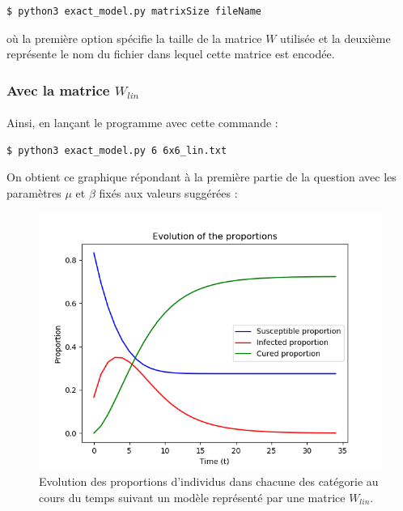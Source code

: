 \documentclass[a4paper, 12pt, oneside]{article}
\begin{document}
\begin{lstlisting}[language=bash]
$ python3 exact_model.py matrixSize fileName
\end{lstlisting}

\noindent où la première option spécifie la taille de la matrice $W$ utilisée et la deuxième représente le nom du fichier dans lequel cette matrice est encodée.

\subsubsection{Avec la matrice $W_{lin}$}

\paragraph{}Ainsi, en lançant le programme avec cette commande :

\begin{lstlisting}[language=bash]
$ python3 exact_model.py 6 6x6_lin.txt
\end{lstlisting}

\noindent On obtient ce graphique répondant à la première partie de la question avec les paramètres $\mu$ et $\beta$ fixés aux valeurs suggérées : 

\begin{figure}[H]
	\centering
	\includegraphics[scale=1]{lin_6x6.png} 
	\caption{Evolution des proportions d'individus dans chacune des catégorie au cours du temps suivant un modèle représenté par une matrice $W_{lin}$.}
\end{figure}
\end{document}
